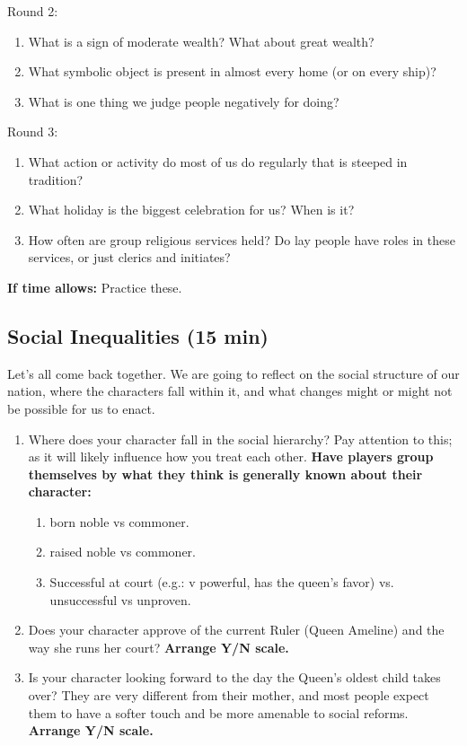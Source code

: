 \documentclass[green]{GL2020}
\begin{document}
Round 2:
\begin{enumerate}
	\item What is a sign of moderate wealth? What about great wealth?
	\item What symbolic object is present in almost every home (or on every ship)?
	\item What is one thing we judge people negatively for doing?
\end{enumerate}

Round 3:
\begin{enumerate}
	\item What action or activity do most of us do regularly that is steeped in tradition?
	\item What holiday is the biggest celebration for us? When is it?
	\item How often are group religious services held? Do lay people have roles in these services, or just clerics and initiates?
\end{enumerate}

\textbf{If time allows:} Practice these.

\subsection*{Social Inequalities (15 min)}
Let’s all come back together. We are going to reflect on the social structure of our nation, where the characters fall within it, and what changes might or might not be possible for us to enact.

\begin{enumerate}
	\item Where does your character fall in the social hierarchy? Pay attention to this; as it will likely influence how you treat each other. \textbf{Have players group themselves by what they think is generally known about their character:}
	\begin{enumerate}
		\item born noble vs commoner.
		\item raised noble vs commoner.
		\item Successful at court (e.g.: v powerful, has the queen’s favor) vs. unsuccessful vs unproven.
	\end{enumerate}
	\item Does your character approve of the current Ruler (Queen Ameline) and the way she runs her court? \textbf{Arrange Y/N scale.}
	\item Is your character looking forward to the day the Queen’s oldest child takes over? They are very different from their mother, and most people expect them to have a softer touch and be more amenable to social reforms. \textbf{Arrange Y/N scale.}
\end{enumerate}
\end{document}

